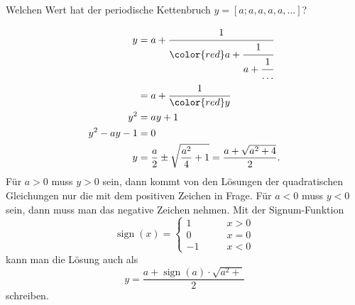 Welchen Wert hat der periodische Kettenbruch 
$y=[a;a,a,a,a,\dots]$?

\begin{loesung}
\begin{align*}
y&=a+\cfrac{1}{{\color{red}a+\cfrac{1}{a+\cfrac{1}{\dots}}}}
\\
&=
a+\cfrac{1}{{\color{red}y}}
\\
y^2&=ay + 1
\\
y^2-ay-1&=0
\\
y&=\frac{a}{2}\pm\sqrt{\frac{a^2}{4}+1}
=
\frac{a+\sqrt{a^2+4}}2.
\end{align*}
Für $a>0$ muss $y>0$ sein, dann kommt von den Lösungen der quadratischen
Gleichungen nur die mit dem positiven Zeichen in Frage.
Für $a<0$ muss $y<0$ sein, dann muss man das negative Zeichen nehmen.
Mit der Signum-Funktion
\[
\operatorname{sign}(x) =
\begin{cases}
1&\qquad x> 0\\
0&\qquad x=0\\
-1&\qquad x<0
\end{cases}
\]
kann man die Lösung auch als
\[
y = \frac{a+\operatorname{sign}(a)\cdot\sqrt{a^2+}}2
\]
schreiben.
\end{loesung}

